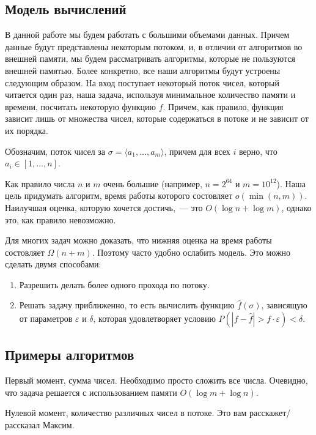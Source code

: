 \documentclass{article}
\newcommand{\abs}[1]{\left| #1 \right|}
\renewcommand{\epsilon}{\varepsilon}
\begin{document}
\subsection{Модель вычислений}
В данной работе мы будем работать с большими объемами данных.
Причем данные будут представлены некоторым потоком, и,
в отличии от алгоритмов во внешней памяти, мы будем рассматривать
алгоритмы, которые не пользуются внешней памятью.
Более конкретно, все наши алгоритмы будут устроены следующим образом.
На вход поступает некоторый поток чисел, который читается один раз,
наша задача, используя минимальное количество памяти и времени,
посчитать некоторую функцию $f$.  Причем, как правило, функция
зависит лишь от множества чисел, которые содержаться в потоке и не зависит от их порядка.

Обозначим, поток чисел за $\sigma = \langle a_1, \ldots, a_m \rangle$, причем для всех $i$
верно, что $a_i \in [1, \ldots, n]$.

Как правило числа $n$ и $m$ очень большие (например, $n = 2^{64}$ и $m = 10^{12}$).
Наша цель придумать алгоритм, время работы которого состовляет $o\left(\min(n, m)\right)$.
Наилучшая оценка, которую хочется достичь,~--- это $O(\log n + \log m)$, однако это,
как правило невозможно.

Для многих задач можно доказать, что нижняя оценка на время работы состовляет $\Omega(n + m)$.
Поэтому часто удобно ослабить модель. Это можно сделать двумя способами:
\begin{enumerate}
\item
Разрешить делать более одного прохода по потоку.

\item
Решать задачу приближенно, то есть вычислить функцию $\hat{f}(\sigma)$,
зависящую от параметров $\epsilon$ и $\delta$, которая удовлетворяет условию
$P \left( \abs{f - \hat{f}}  > f \cdot \epsilon \right) < \delta$.
\end{enumerate}



\subsection{Примеры алгоритмов}

Первый момент, сумма чисел. Необходимо просто сложить все числа.
Очевидно, что задача решается с использованием памяти $O(\log m + \log n)$.

Нулевой момент, количество различных чисел в потоке. Это вам расскажет/рассказал Максим.
\end{document}
